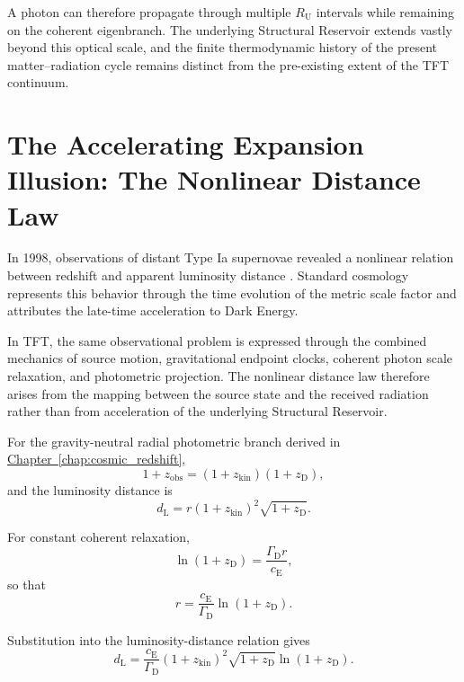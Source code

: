 A photon can therefore propagate through multiple $R_{\mathrm U}$ intervals while remaining on the coherent eigenbranch. The underlying Structural Reservoir extends vastly beyond this optical scale, and the finite thermodynamic history of the present matter--radiation cycle remains distinct from the pre-existing extent of the TFT continuum.


\section{The Accelerating Expansion Illusion: The Nonlinear Distance Law}

In 1998, observations of distant Type Ia supernovae revealed a nonlinear relation between redshift and apparent luminosity distance \cite{Riess_1998}. Standard cosmology represents this behavior through the time evolution of the metric scale factor and attributes the late-time acceleration to Dark Energy.

In TFT, the same observational problem is expressed through the combined mechanics of source motion, gravitational endpoint clocks, coherent photon scale relaxation, and photometric projection. The nonlinear distance law therefore arises from the mapping between the source state and the received radiation rather than from acceleration of the underlying Structural Reservoir.

For the gravity-neutral radial photometric branch derived in
\hyperref[chap:cosmic_redshift]{Chapter~\ref*{chap:cosmic_redshift}},
\begin{equation}
    1+z_{\mathrm{obs}}
    =
    (1+z_{\mathrm{kin}})
    (1+z_{\mathrm D}),
\end{equation}
and the luminosity distance is
\begin{equation}
    d_{\mathrm L}
    =
    r
    (1+z_{\mathrm{kin}})^2
    \sqrt{1+z_{\mathrm D}}.
\end{equation}

For constant coherent relaxation,
\begin{equation}
    \ln(1+z_{\mathrm D})
    =
    \frac{\Gamma_{\mathrm D}r}{c_{\mathrm E}},
\end{equation}
so that
\begin{equation}
    r
    =
    \frac{c_{\mathrm E}}{\Gamma_{\mathrm D}}
    \ln(1+z_{\mathrm D}).
\end{equation}

Substitution into the luminosity-distance relation gives
\begin{equation}
    d_{\mathrm L}
    =
    \frac{c_{\mathrm E}}{\Gamma_{\mathrm D}}
    (1+z_{\mathrm{kin}})^2
    \sqrt{1+z_{\mathrm D}}
    \ln(1+z_{\mathrm D}).
\end{equation}

